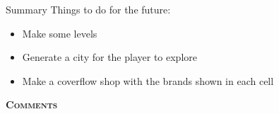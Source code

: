 \documentclass[12pt]{beamer}
\begin{document}
\begin{frame}{Summary}
	Things to do for the future:
	\begin{itemize}
		\item Make some levels
		\item Generate a city for the player to explore
		\item Make a coverflow shop with the brands shown in each cell
	\end{itemize}
\end{frame}
\begin{frame}{}
	\centering\textsc{\textbf{Comments}}
\end{frame}
\end{document}
